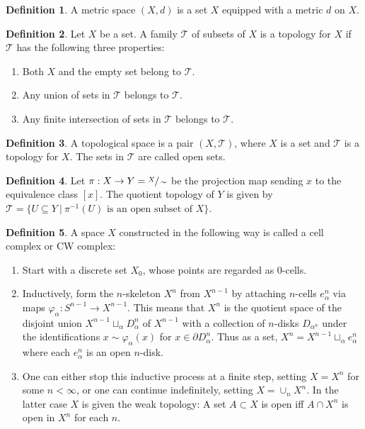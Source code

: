 \documentclass{article}
\theoremstyle{definition}
\newtheorem{definition}{Definition}[section]
\theoremstyle{remark}
\begin{document}
\begin{definition}
A metric space $(X, d)$ is a set $X$ equipped with a metric $d$ on $X$. 
\end{definition}

\begin{definition}
Let $X$ be a set. A family $\mathscr{T}$ of subsets of $X$ is a topology for $X$ if $\mathscr{T}$ has the following three properties: 
\begin{enumerate}
    \item Both $X$ and the empty set belong to $\mathscr{T}$.
    \item Any union of sets in $\mathscr{T}$ belongs to $\mathscr{T}$.
    \item Any finite intersection of sets in $\mathscr{T}$ belongs to $\mathscr{T}$. 
\end{enumerate}
\end{definition}

\begin{definition}
A topological space is a pair $(X, \mathscr{T})$, where $X$ is a set and $\mathscr{T}$ is a topology for $X$. The sets in $\mathscr{T}$ are called open sets.  
\end{definition}

\begin{definition}
Let $\pi: X \rightarrow Y = \sfrac{X}{\sim}$ be the projection map sending $x$ to the equivalence class $[x]$. The quotient topology of $Y$ is given by $\mathscr{T} = \{U \subseteq Y \:|\: \pi^{-1}(U) \text{ is an open subset of $X$}\}$.
\end{definition}

\begin{definition}
A space $X$ constructed in the following way is called a cell complex or CW complex:
\begin{enumerate}
    \item Start with a discrete set $X_{0}$, whose points are regarded as $0$-cells.
    \item Inductively, form the $n$-skeleton $X^{n}$ from $X^{n - 1}$ by attaching $n$-cells $e_{\alpha}^{n}$ via maps $\varphi_{\alpha}: S^{n - 1} \rightarrow X^{n - 1}$. This means that $X^{n}$ is the quotient space of the disjoint union $X^{n - 1} \sqcup_{\alpha} D_{\alpha}^{n}$ of $X^{n - 1}$ with a collection of $n$-disks $D_{\alpha^{n}}$ under the identifications $x \sim \varphi_{\alpha}(x)$ for $x \in \partial D_{\alpha}^{n}$. Thus as a set, $X^{n} = X^{n - 1} \sqcup_{\alpha} e_{\alpha}^{n}$ where each $e_{\alpha}^{n}$ is an open $n$-disk.  
    \item One can either stop this inductive process at a finite step, setting $X = X^{n}$ for some $n < \infty$, or one can continue indefinitely, setting $X = \cup_{n} X^{n}$. In the latter case $X$ is given the weak topology: A set $A \subset X$ is open iff $A \cap X^{n}$ is open in $X^{n}$ for each $n$. 
\end{enumerate}
\end{definition}
\end{document}
